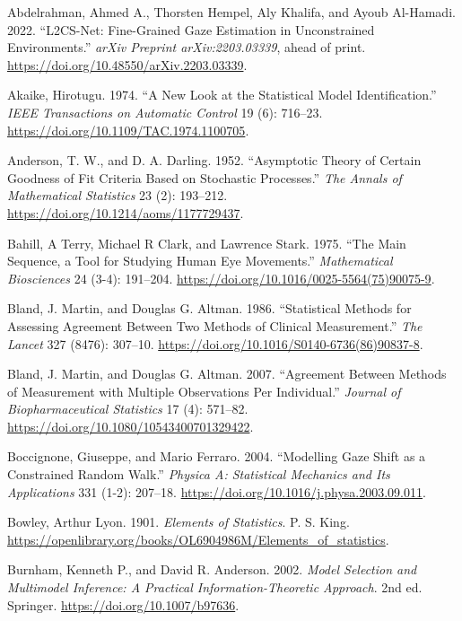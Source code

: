 \documentclass[
]{article}
\newcounter{none} %
\newlength{\cslhangindent}
\newenvironment{CSLReferences}[2] %
 {\begin{list}{}{%
  \setlength{\itemindent}{0pt}
  \setlength{\leftmargin}{0pt}
  \setlength{\parsep}{0pt}
  \ifodd #1
   \setlength{\leftmargin}{\cslhangindent}
   \setlength{\itemindent}{-1\cslhangindent}
  \fi
  \setlength{\itemsep}{#2\baselineskip}}}
 {\end{list}}
\begin{document}
\protect{}\label{refs}
\begin{CSLReferences}{1}{1}
Abdelrahman, Ahmed A., Thorsten Hempel, Aly Khalifa, and Ayoub
Al-Hamadi. 2022. {``L2CS-Net: Fine-Grained Gaze Estimation in
Unconstrained Environments.''} \emph{arXiv Preprint arXiv:2203.03339},
ahead of print. \url{https://doi.org/10.48550/arXiv.2203.03339}.

Akaike, Hirotugu. 1974. {``A New Look at the Statistical Model
Identification.''} \emph{IEEE Transactions on Automatic Control} 19 (6):
716--23. \url{https://doi.org/10.1109/TAC.1974.1100705}.

Anderson, T. W., and D. A. Darling. 1952. {``Asymptotic Theory of
Certain Goodness of Fit Criteria Based on Stochastic Processes.''}
\emph{The Annals of Mathematical Statistics} 23 (2): 193--212.
\url{https://doi.org/10.1214/aoms/1177729437}.

Bahill, A Terry, Michael R Clark, and Lawrence Stark. 1975. {``The Main
Sequence, a Tool for Studying Human Eye Movements.''} \emph{Mathematical
Biosciences} 24 (3-4): 191--204.
\url{https://doi.org/10.1016/0025-5564(75)90075-9}.

Bland, J. Martin, and Douglas G. Altman. 1986. {``Statistical Methods
for Assessing Agreement Between Two Methods of Clinical Measurement.''}
\emph{The Lancet} 327 (8476): 307--10.
\url{https://doi.org/10.1016/S0140-6736(86)90837-8}.

Bland, J. Martin, and Douglas G. Altman. 2007. {``Agreement Between
Methods of Measurement with Multiple Observations Per Individual.''}
\emph{Journal of Biopharmaceutical Statistics} 17 (4): 571--82.
\url{https://doi.org/10.1080/10543400701329422}.

Boccignone, Giuseppe, and Mario Ferraro. 2004. {``Modelling Gaze Shift
as a Constrained Random Walk.''} \emph{Physica A: Statistical Mechanics
and Its Applications} 331 (1-2): 207--18.
\url{https://doi.org/10.1016/j.physa.2003.09.011}.

Bowley, Arthur Lyon. 1901. \emph{Elements of Statistics}. P. S. King.
\url{https://openlibrary.org/books/OL6904986M/Elements_of_statistics}.

Burnham, Kenneth P., and David R. Anderson. 2002. \emph{Model Selection
and Multimodel Inference: A Practical Information-Theoretic Approach}.
2nd ed. Springer. \url{https://doi.org/10.1007/b97636}.


\end{CSLReferences}
\end{document}
